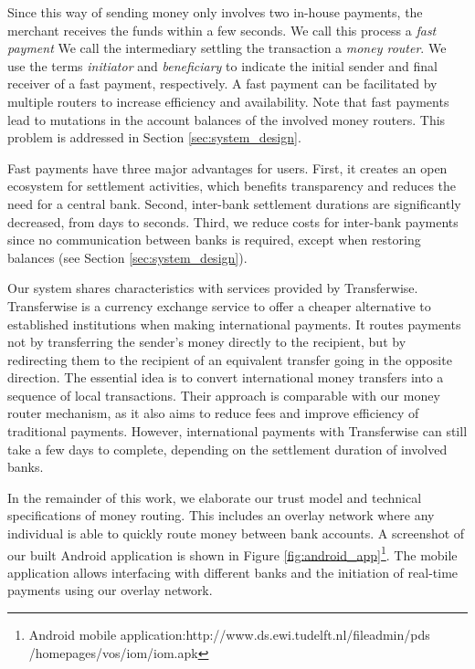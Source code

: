 Since this way of sending money only involves two in-house payments, the merchant receives the funds within a few seconds.
We call this process a \emph{fast payment}
We call the intermediary settling the transaction a \emph{money router}.
We use the terms \emph{initiator} and \emph{beneficiary} to indicate the initial sender and final receiver of a fast payment, respectively.
A fast payment can be facilitated by multiple routers to increase efficiency and availability.
Note that fast payments lead to mutations in the account balances of the involved money routers.
This problem is addressed in Section \ref{sec:system_design}.

Fast payments have three major advantages for users.
First, it creates an open ecosystem for settlement activities, which benefits transparency and reduces the need for a central bank.
Second, inter-bank settlement durations are significantly decreased, from days to seconds. %
Third, we reduce costs for inter-bank payments since no communication between banks is required, except when restoring balances (see Section \ref{sec:system_design}).

Our system shares characteristics with services provided by Transferwise.
Transferwise is a currency exchange service to offer a cheaper alternative to established institutions when making international payments.
It routes payments not by transferring the sender's money directly to the recipient, but by redirecting them to the recipient of an equivalent transfer going in the opposite direction.
The essential idea is to convert international money transfers into a sequence of local transactions.
Their approach is comparable with our money router mechanism, as it also aims to reduce fees and improve efficiency of traditional payments.
However, international payments with Transferwise can still take a few days to complete, depending on the settlement duration of involved banks.

In the remainder of this work, we elaborate our trust model and technical specifications of money routing.
This includes an overlay network where any individual is able to quickly route money between bank accounts.
A screenshot of our built Android application is shown in Figure \ref{fig:android_app}\footnote{Android mobile application:http://www.ds.ewi.tudelft.nl/fileadmin/pds\\/homepages/vos/iom/iom.apk}.
The mobile application allows interfacing with different banks and the initiation of real-time payments using our overlay network.

